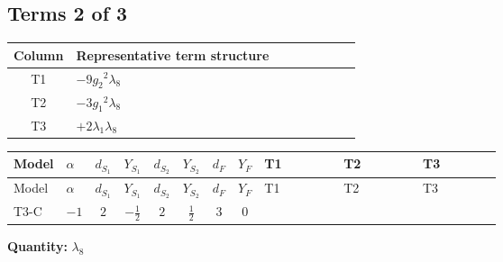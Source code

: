 \documentclass[8pt]{article}
\begin{document}
\begin{landscape}
\subsection*{Terms 2 of 3}
\begin{center}
\begin{tabular}{@{}c >{\raggedright\arraybackslash}p{0.82\linewidth}@{}}
\toprule
Column & Representative term structure \\
\midrule
T1 & \(\displaystyle -9 {g_2}^2 {\lambda_{8}}\) \\
\midrule
T2 & \(\displaystyle -3 {g_1}^2 {\lambda_{8}}\) \\
\midrule
T3 & \(\displaystyle +2 {\lambda_1} {\lambda_{8}}\) \\
\midrule
\bottomrule
\end{tabular}
\end{center}
\smallskip
\tiny
\begin{longtable}{@{}llcccccc >{\raggedright\arraybackslash}p{0.21\linewidth} >{\raggedright\arraybackslash}p{0.21\linewidth} >{\raggedright\arraybackslash}p{0.21\linewidth}@{}}
\toprule
Model & $\alpha$ & $d_{S_1}$ & $Y_{S_1}$ & $d_{S_2}$ & $Y_{S_2}$ & $d_F$ & $Y_F$ & T1 & T2 & T3 \\
\midrule
\endfirsthead
\toprule
Model & $\alpha$ & $d_{S_1}$ & $Y_{S_1}$ & $d_{S_2}$ & $Y_{S_2}$ & $d_F$ & $Y_F$ & T1 & T2 & T3 \\
\midrule
\endhead
T3-C & $-1$ & $2$ & $-\frac{1}{2}$ & $2$ & $\frac{1}{2}$ & $3$ & $0$ & \scriptsize\adjustbox{max width=\linewidth}{$\begin{gathered} -9 {g_2}^2 {\lambda_{8}}\end{gathered}$} & \scriptsize\adjustbox{max width=\linewidth}{$\begin{gathered} -3 {g_1}^2 {\lambda_{8}}\end{gathered}$} & \scriptsize\adjustbox{max width=\linewidth}{$\begin{gathered} +2 {\lambda_1} {\lambda_{8}}\end{gathered}$} \\
\midrule
\bottomrule
\end{longtable}
\clearpage
\noindent\textbf{Quantity: }$\lambda_{8}$\par\smallskip

\end{landscape}
\end{document}
